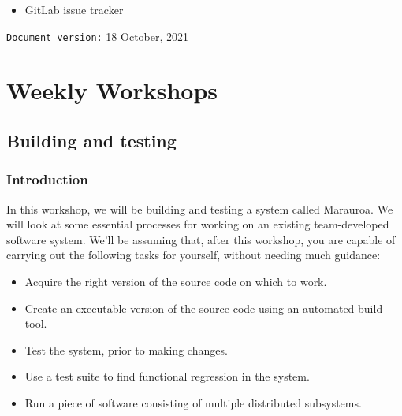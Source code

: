 \documentclass[
]{book}
\providecommand{\tightlist}{%
  \setlength{\itemsep}{0pt}\setlength{\parskip}{0pt}}
\begin{document}
\begin{itemize}
\tightlist
\item
  GitLab issue tracker
\end{itemize}



























\texttt{Document\ version:} 18 October, 2021

\hypertarget{part-weekly-workshops}{%
\part{Weekly Workshops}\label{part-weekly-workshops}}

\hypertarget{building}{%
\chapter{Building and testing}\label{building}}

\hypertarget{Introduction}{%
\section{Introduction}\label{Introduction}}

In this workshop, we will be building and testing a system called Marauroa. We will look at some essential processes for working on an existing team-developed software system. We'll be assuming that, after this workshop, you are capable of carrying out the following tasks for yourself, without needing much guidance:

\begin{itemize}
\tightlist
\item
  Acquire the right version of the source code on which to work.
\item
  Create an executable version of the source code using an automated build tool.
\item
  Test the system, prior to making changes.
\item
  Use a test suite to find functional regression in the system.\\
\item
  Run a piece of software consisting of multiple distributed subsystems.
\end{itemize}
\end{document}
